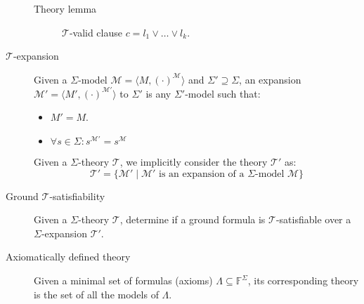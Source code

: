 \begin{description}
        \begin{description}
            \item[Theory lemma] 
                $\mathcal{T}$-valid clause $c = l_1 \vee \dots \vee l_k$.
        \end{description}

    \item[$\mathbf{\mathcal{T}}$-expansion] 
        Given a $\Sigma$-model $\mathcal{M} = \langle M, (\cdot)^\mathcal{M} \rangle$ and $\Sigma' \supseteq \Sigma$,
        an expansion $\mathcal{M}' = \langle M', (\cdot)^{\mathcal{M}'} \rangle$ to $\Sigma'$ is any $\Sigma'$-model such that:
        \begin{itemize}
            \item $M' = M$.
            \item $\forall s \in \Sigma: s^{\mathcal{M}'} = s^\mathcal{M}$
        \end{itemize}

        \begin{remark}
            Given a $\Sigma$-theory $\mathcal{T}$, we implicitly consider the theory $\mathcal{T}'$ as:
            \[ \mathcal{T}' = \{ \mathcal{M}' \mid \mathcal{M}' \text{ is an expansion of a $\Sigma$-model } \mathcal{M} \} \]
        \end{remark}

    \item[Ground $\mathbf{\mathcal{T}}$-satisfiability] 
        Given a $\Sigma$-theory $\mathcal{T}$, determine if a ground formula is $\mathcal{T}$-satisfiable over a $\Sigma$-expansion $\mathcal{T}'$.

    \item[Axiomatically defined theory] 
        Given a minimal set of formulas (axioms) $\Lambda \subseteq \mathbb{F}^\Sigma$,
        its corresponding theory is the set of all the models of $\Lambda$.
\end{description}

